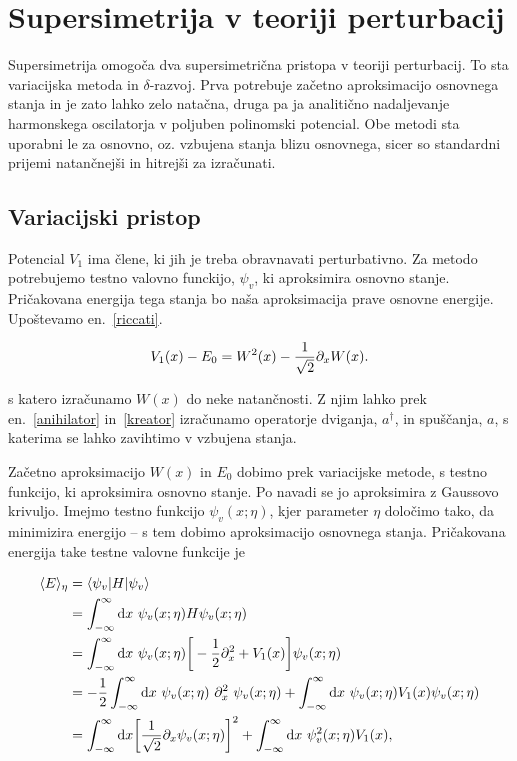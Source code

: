 \section{Supersimetrija v teoriji perturbacij}

Supersimetrija omogo\v ca dva supersimetri\v cna pristopa v teoriji perturbacij. To sta variacijska metoda in $\delta$-razvoj.
Prva potrebuje za\v cetno aproksimacijo osnovnega stanja in je zato lahko zelo nata\v cna, druga pa ja analiti\v cno nadaljevanje
harmonskega oscilatorja v poljuben polinomski potencial. Obe metodi sta uporabni le za osnovno, oz. vzbujena stanja blizu osnovnega,
sicer so standardni prijemi natan\v cnej\v si in hitrej\v si za izra\v cunati.

\subsection{Variacijski pristop}

Potencial $V_1$ ima \v clene, ki jih je treba obravnavati perturbativno. Za metodo potrebujemo testno valovno funckijo, $\psi_v$,
ki aproksimira osnovno stanje. Pri\v cakovana energija tega stanja bo na\v sa aproksimacija prave osnovne energije.
Upo\v stevamo en.~\eqref{riccati}.

\begin{equation}
	V_1(x) - E_0 = W^2(x) - \frac{1}{\sqrt{2}}\partial_x W(x).
\end{equation}

\ni s katero izra\v cunamo $W(x)$ do neke natan\v cnosti. Z njim lahko prek en.~\eqref{anihilator} in~\eqref{kreator} izra\v cunamo
operatorje dviganja, $a^\dagger$, in spu\v s\v canja, $a$, s katerima se lahko zavihtimo v vzbujena stanja.

Za\v cetno aproksimacijo $W(x)$ in $E_0$ dobimo prek variacijske metode, s testno funkcijo, ki aproksimira osnovno stanje. Po
navadi se jo aproksimira z Gaussovo krivuljo. Imejmo testno funkcijo $\psi_v (x;\eta)$, kjer parameter $\eta$ dolo\v cimo tako,
da minimizira energijo -- s tem dobimo aproksimacijo osnovnega stanja. Pri\v cakovana energija take testne valovne funkcije je

\begin{align}
	\langle E \rangle_\eta &= \langle \psi_v| H |\psi_v \rangle \notag \\
	&= \intinf\ \psi_v (x; \eta) H \psi_v (x; \eta) \notag \\
	&= \intinf\ \psi_v (x;\eta) \bigg[-\frac{1}{2}\px^2 + V_1(x)\bigg]\psi_v(x;\eta) \notag \\
	&= -\frac{1}{2}\intinf\ \psi_v(x;\eta)\ \px^2\ \psi_v (x;\eta) + \intinf\ \psi_v(x;\eta)V_1(x)\psi_v(x;\eta) \notag \\
	&= \intinf \bigg[\koren \px \psi_v(x;\eta)\bigg]^2 + \intinf\ \psi_v^2 (x; \eta) V_1 (x), \label{eeta}
\end{align}

